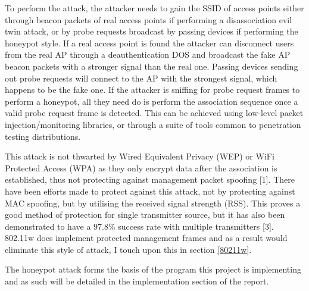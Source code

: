 To perform the attack, the attacker needs to gain the SSID of access points either through beacon packets of real access points if performing a disassociation evil twin attack, or by probe requests broadcast by passing devices if performing the honeypot style. If a real access point is found the attacker can disconnect users from the real AP through a deauthentication DOS and broadcast the fake AP beacon packets with a stronger signal than the real one. Passing devices sending out probe requests will connect to the AP with the strongest signal, which happens to be the fake one. If the attacker is sniffing for probe request frames to perform a honeypot, all they need do is perform the association sequence once a valid probe request frame is detected. This can be achieved using low-level packet injection/monitoring libraries, or through a suite of tools common to penetration testing distributions.  

This attack is not thwarted by Wired Equivalent Privacy (WEP) or WiFi Protected Access (WPA) as they only encrypt data after the association is established, thus not protecting against management packet spoofing [1]. There have been efforts made to protect against this attack, not by protecting against MAC spoofing, but by utilising the received signal strength (RSS). This proves a good method of protection for single transmitter source, but it has also been demonstrated to have a 97.8\% success rate with multiple transmitters [3]. 802.11w does implement protected management frames and as a result would eliminate this style of attack, I touch upon this in section \ref{80211w}.

The honeypot attack forms the basis of the program this project is implementing and as such will be detailed in the implementation section of the report.